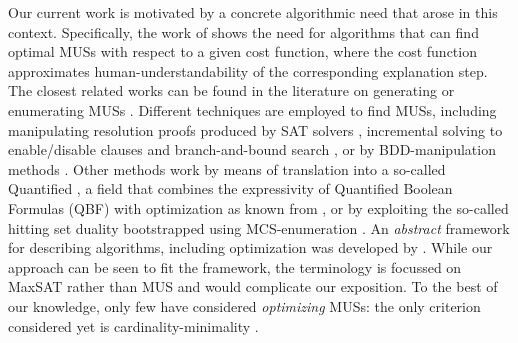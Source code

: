 Our current work is motivated by a concrete algorithmic need that arose in this context. 
Specifically, the work of \citet{ecai/BogaertsGCG20} shows the need for algorithms that can find optimal MUSs with respect to a given cost function, where the cost function approximates human-understandability of the corresponding explanation step. 
The closest related works can be found in the literature on generating or enumerating MUSs \cite{conf/sat/LynceM04,liffiton2016fast}.
Different techniques are employed to find MUSs, including  manipulating resolution proofs produced by SAT solvers \cite{goldberg,DBLP:journals/fmsd/GershmanKS08,DBLP:conf/sat/DershowitzHN06}, incremental solving to enable/disable clauses and branch-and-bound search \cite{DBLP:conf/dac/OhMASM04}, or by BDD-manipulation methods \cite{huang}.
Other methods work by means of translation into a so-called Quantified \maxsat \cite{DBLP:journals/constraints/IgnatievJM16}, a field that combines the expressivity of Quantified Boolean Formulas (QBF)  with optimization as known from \maxsat {}, or by exploiting the so-called hitting set duality \cite{ignatiev2015smallest} bootstrapped using MCS-enumeration \cite{marques2020reasoning}. 
An \textit{abstract} framework for describing \hitsetbased algorithms, including optimization was developed by \citet{DBLP:conf/kr/SaikkoWJ16}. While our approach can be seen to fit the framework, the terminology is focussed on MaxSAT rather than MUS and would complicate our exposition.
To the best of our knowledge, only few have considered \emph{optimizing} MUSs: the only criterion considered yet is cardinality-minimality \cite{conf/sat/LynceM04,ignatiev2015smallest}. 






